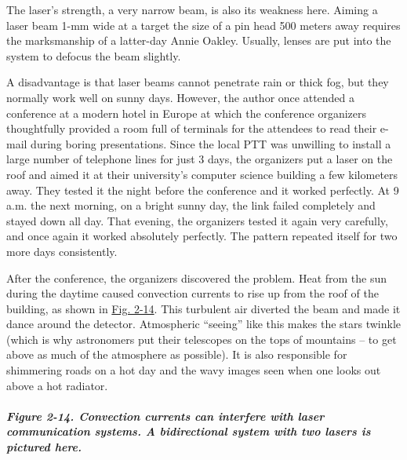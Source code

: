 The laser's strength, a very narrow beam, is also its weakness here.
Aiming a laser beam 1-mm wide at a target the size of a pin head 500
meters away requires the marksmanship of a latter-day Annie Oakley.
Usually, lenses are put into the system to defocus the beam slightly.

A disadvantage is that laser beams cannot penetrate rain or thick fog,
but they normally work well on sunny days. However, the author once
attended a conference at a modern hotel in Europe at which the
conference organizers thoughtfully provided a room full of terminals for
the attendees to read their e-mail during boring presentations. Since
the local PTT was unwilling to install a large number of telephone lines
for just 3 days, the organizers put a laser on the roof and aimed it at
their university's computer science building a few kilometers away. They
tested it the night before the conference and it worked perfectly. At 9
a.m. the next morning, on a bright sunny day, the link failed completely
and stayed down all day. That evening, the organizers tested it again
very carefully, and once again it worked absolutely perfectly. The
pattern repeated itself for two more days consistently.

After the conference, the organizers discovered the problem. Heat from
the sun during the daytime caused convection currents to rise up from
the roof of the building, as shown in
\protect\hyperlink{0130661023_ch02lev1sec3.htmlux5cux23ch02fig14}{Fig.
2-14}. This turbulent air diverted the beam and made it dance around the
detector. Atmospheric ``seeing'' like this makes the stars twinkle
(which is why astronomers put their telescopes on the tops of
mountains -- to get above as much of the atmosphere as possible). It is
also responsible for shimmering roads on a hot day and the wavy images
seen when one looks out above a hot radiator.

\subparagraph[Figure 2-14. Convection currents can interfere with laser
communication systems. A bidirectional system with two lasers is
pictured
here.]{\texorpdfstring{\protect\hypertarget{0130661023_ch02lev1sec3.htmlux5cux23ch02fig14}{}{}Figure
2-14. Convection currents can interfere with laser communication
systems. A bidirectional system with two lasers is pictured
here.}{Figure 2-14. Convection currents can interfere with laser communication systems. A bidirectional system with two lasers is pictured here.}}


\protect\hypertarget{0130661023_ch02lev1sec4.html}{}{}

